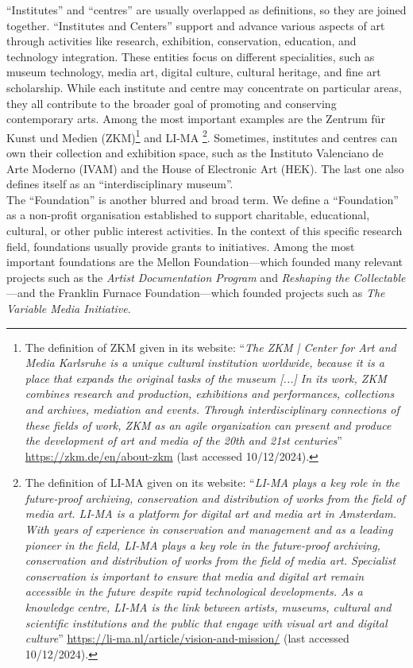 ``Institutes'' and ``centres'' are usually overlapped as definitions, so they are joined together. ``Institutes and Centers'' support and advance various aspects of art through activities like research, exhibition, conservation, education, and technology integration. These entities focus on different specialities, such as museum technology, media art, digital culture, cultural heritage, and fine art scholarship. While each institute and centre may concentrate on particular areas, they all contribute to the broader goal of promoting and conserving contemporary arts. Among the most important examples are the Zentrum für Kunst und Medien (ZKM)\footnote{The definition of ZKM given in its website: ``\textit{The ZKM | Center for Art and Media Karlsruhe is a unique cultural institution worldwide, because it is a place that expands the original tasks of the museum [...] In its work, ZKM combines research and production, exhibitions and performances, collections and archives, mediation and events. Through interdisciplinary connections of these fields of work, ZKM as an agile organization can present and produce the development of art and media of the 20th and 21st centuries}'' \url{https://zkm.de/en/about-zkm} (last accessed 10/12/2024).} and LI-MA \footnote{The definition of LI-MA given on its website: ``\textit{LI-MA plays a key role in the future-proof archiving, conservation and distribution of works from the field of media art. LI-MA is a platform for digital art and media art in Amsterdam. With years of experience in conservation and management and as a leading pioneer in the field, LI-MA plays a key role in the future-proof archiving, conservation and distribution of works from the field of media art. Specialist conservation is important to ensure that media and digital art remain accessible in the future despite rapid technological developments. As a knowledge centre, LI-MA is the link between artists, museums, cultural and scientific institutions and the public that engage with visual art and digital culture}'' \url{https://li-ma.nl/article/vision-and-mission/} (last accessed 10/12/2024).}. Sometimes, institutes and centres can own their collection and exhibition space, such as the Instituto Valenciano de Arte Moderno (IVAM) and the House of Electronic Art (HEK). The last one also defines itself as an ``interdisciplinary museum''.\\
The ``Foundation'' is another blurred and broad term. We define a ``Foundation'' as a non-profit organisation established to support charitable, educational, cultural, or other public interest activities. In the context of this specific research field, foundations usually provide grants to initiatives. Among the most important foundations are the Mellon Foundation—which founded many relevant projects such as the \textit{Artist Documentation Program} and \textit{Reshaping the Collectable}—and the Franklin Furnace Foundation—which founded projects such as \textit{The Variable Media Initiative}.\\
